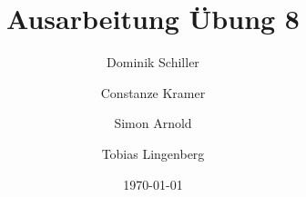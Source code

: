 \documentclass[
ngerman,
twoside,
pdfa=false,
ruledheaders=section,%
class=report,%
thesis={type=sta},%
accentcolor=TUDa-2c,%
custommargins=false,%
marginpar=false,%
parskip=half-,%
fontsize=11pt,%
]{tudapub}
\begin{document}
	
	\title{Ausarbeitung Übung 8}
	\author[D. Schiller, C. Kramer, S.Arnold, T. Lingenberg]{Dominik Schiller \and Constanze Kramer \and Simon Arnold \and Tobias Lingenberg} %
	
	\department{} %

	
	\date{\today}
	
	
	\maketitle
	
	
	
	
	
	\cleardoublepage
	\tableofcontents %
	
	\setcounter{page}{1} %
	
	
	 
	
	
	
	
	
	\listoffigures %
	
	
	
\end{document}
